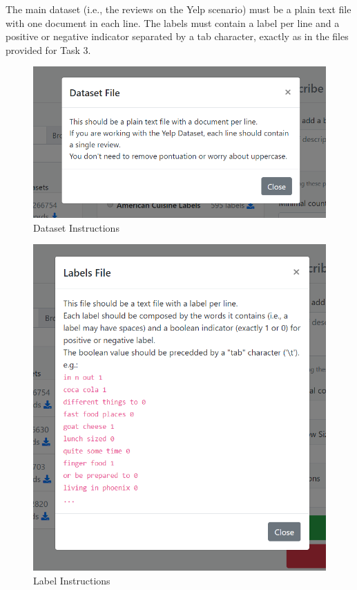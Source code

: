 \documentclass[table,xcdraw]{article}
\begin{document}
The main dataset (i.e., the reviews on the Yelp scenario) must be a plain text file with one document in each line. The labels must contain a label per line and a positive or negative indicator separated by a tab character, exactly as in the files provided for Task 3.

\begin{figure}[H]
	\centering
	\includegraphics[width=\linewidth]{screen_help_dataset}
	\caption{Dataset Instructions}
	\label{fig:screen_help_dataset}
	\end{figure}

\begin{figure}[H]
	\centering
	\includegraphics[width=\linewidth]{screen_help_labels}
	\caption{Label Instructions}
	\label{fig:screen_help_labels}
	\end{figure}
\end{document}
